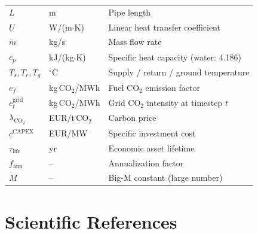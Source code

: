 \documentclass[a4paper,12pt]{article}
\begin{document}
\begin{table}[h!]
\begin{tabular}{@{}lll@{}}
    $L$                              & m              & Pipe length \\
    $U$                              & W/(m$\cdot$K)  & Linear heat transfer coefficient \\
    $\dot{m}$                        & kg/s           & Mass flow rate \\
    $c_p$                            & kJ/(kg$\cdot$K)& Specific heat capacity (water: 4.186) \\
    $T_s, T_r, T_g$                  & $^\circ$C      & Supply / return / ground temperature \\
    $e_f$                            & kg\,CO$_2$/MWh & Fuel CO$_2$ emission factor \\
    $e^{\text{grid}}_t$              & kg\,CO$_2$/MWh & Grid CO$_2$ intensity at timestep $t$ \\
    $\lambda_{\text{CO}_2}$          & EUR/t\,CO$_2$  & Carbon price \\
    $c^{\text{CAPEX}}$               & EUR/MW         & Specific investment cost \\
    $\tau_{\text{life}}$             & yr             & Economic asset lifetime \\
    $f_{\text{ann}}$                 & --             & Annualization factor \\
    $M$                              & --             & Big-M constant (large number) \\
    \bottomrule
  \end{tabular}
  \label{tab:notation}
\end{table}

\section*{Scientific References}
\end{document}

